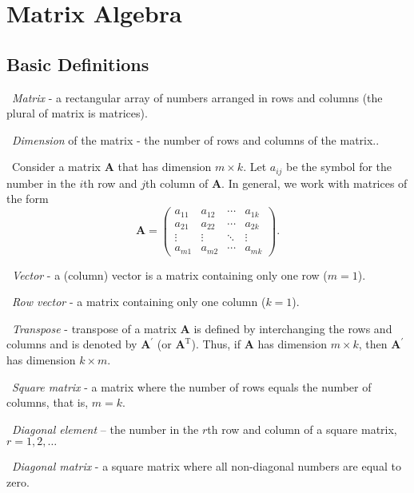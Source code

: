 
\chapter{Matrix Algebra}

\vspace{-1.5in}

\section{Basic Definitions}

\quad \textbullet\ \emph{Matrix} - a rectangular array of numbers
arranged in rows and columns (the plural of matrix is matrices).

\textbullet\ \emph{Dimension} of the matrix - the number of rows and columns
of the matrix..

\textbullet\ Consider a matrix $\mathbf{A}$ that has dimension
$m\times k$. Let $a_{ij}$ be the symbol for the number in the $i$th
row and $j$th column of $\mathbf{A}$. In general, we work with
matrices of the form
\begin{equation*}
\mathbf{A=}\left(
\begin{array}{cccc}
a_{11} & a_{12} & \cdots & a_{1k} \\
a_{21} & a_{22} & \cdots & a_{2k} \\
\vdots & \vdots & \ddots & \vdots \\
a_{m1} & a_{m2} & \cdots & a_{mk}
\end{array}
\right) .
\end{equation*}

\textbullet\ \emph{Vector} - a (column) vector is a matrix containing only
one row ($m=1$).

\textbullet\ \emph{Row vector} - a matrix containing only one column ($k=1$).

\textbullet\ \emph{Transpose} - transpose of a matrix $\mathbf{A}$
is defined by interchanging the rows and columns and is denoted by
$\mathbf{A}^{\prime}$ (or $\mathbf{A}^{\mathrm{T}}$). Thus, if
$\mathbf{A}$ has dimension $m\times k$, then $\mathbf{A}^{\prime}$
has dimension $k\times m$.

\textbullet\ \emph{Square matrix} - a matrix where the number of rows equals
the number of columns, that is, $m=k$.

\textbullet\ \emph{Diagonal element} -- the number in the $r$th row and
column of a square matrix, $r=1,2,\ldots $

\textbullet\ \emph{Diagonal matrix} - a square matrix where all non-diagonal
numbers are equal to zero.

